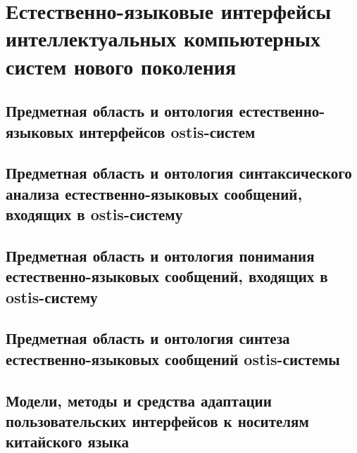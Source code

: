 \chapter{Естественно-языковые интерфейсы интеллектуальных компьютерных систем нового поколения}
\label{chapter_nl_interfaces}


\section{Предметная область и онтология естественно-языковых интерфейсов ostis-систем}
\section{Предметная область и онтология синтаксического анализа естественно-языковых сообщений, входящих в ostis-систему}
\section{Предметная область и онтология понимания естественно-языковых сообщений, входящих в ostis-систему}
\section{Предметная область и онтология синтеза естественно-языковых сообщений ostis-системы}
\section{Модели, методы и средства адаптации пользовательских интерфейсов к носителям китайского языка}
\label{section_chinese_interfaces}

%